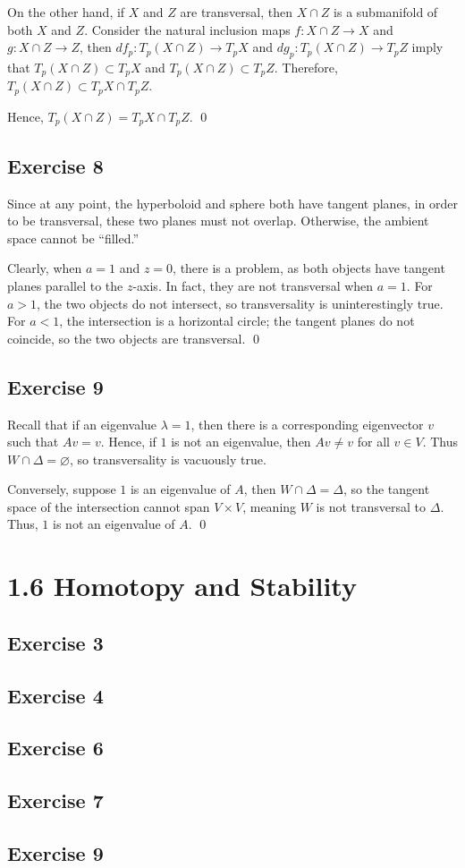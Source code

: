 \documentclass{article}
\begin{document}
    On the other hand, if $X$ and $Z$ are transversal, then $X\cap Z$ is a
    submanifold of both $X$ and $Z$. Consider the natural inclusion maps $f
    \colon X\cap Z\to X$ and $g\colon X\cap Z\to Z$, then $df_p\colon T_p(X\cap
    Z)\to T_pX$ and $dg_p\colon T_p(X\cap Z)\to T_pZ$ imply that
    $T_p(X\cap Z)\subset T_pX$ and $T_p(X\cap Z)\subset T_pZ$.
    Therefore, $T_p(X\cap Z)\subset T_pX\cap T_pZ$.

    Hence, $T_p(X\cap Z)=T_pX\cap T_pZ$.
    \qed

  \subsection*{Exercise 8}
    Since at any point, the hyperboloid and sphere both have tangent planes,
    in order to be transversal, these two planes must not overlap. Otherwise,
    the ambient space cannot be ``filled.''

    Clearly, when $a=1$ and $z=0$, there is a problem, as both objects have
    tangent planes parallel to the $z$-axis. In fact, they are not transversal
    when $a=1$. For $a>1$, the two objects do not intersect, so transversality
    is uninterestingly true. For $a<1$, the intersection is a horizontal circle;
    the tangent planes do not coincide, so the two objects are transversal.
    \qed

  \subsection*{Exercise 9}
    Recall that if an eigenvalue $\lambda=1$, then there is a corresponding
    eigenvector $v$ such that $Av=v$. Hence, if $1$ is not an eigenvalue, then
    $Av\ne v$ for all $v\in V$. Thus $W\cap\Delta=\varnothing$, so
    transversality is vacuously true.

    Conversely, suppose $1$ is an eigenvalue of $A$, then $W\cap\Delta=\Delta$,
    so the tangent space of the intersection cannot span $V\times V$, meaning
    $W$ is not transversal to $\Delta$. Thus, $1$ is not an eigenvalue of $A$.
    \qed

\section*{1.6 Homotopy and Stability}
  \subsection*{Exercise 3}
  \subsection*{Exercise 4}
  \subsection*{Exercise 6}
  \subsection*{Exercise 7}
  \subsection*{Exercise 9}
\end{document}
